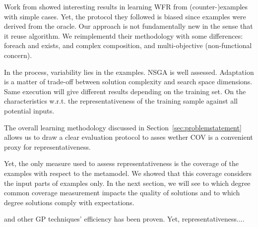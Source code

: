 Work from \cite{faunes2013} showed interesting results in learning WFR from (counter-)examples with simple cases. Yet, the protocol they followed is biased since examples were derived from the oracle.
Our approach is not fundamentally new in the sense that it reuse \cite{faunes2013-2} algorithm. We reimplementd their methodology with some differences: foreach and exists, and complex composition, and multi-objective (non-functional concern).


In the process, variability lies in the examples.
NSGA is well assessed. Adaptation is a matter of trade-off between solution complexity and search space dimensions.
Same execution will give different results depending on the training set. On the characteristics w.r.t. the representativeness of the training sample against all potential inputs.


The overall learning methodology discussed in Section~\ref{sec:problemstatement} allows us to draw a clear evaluation protocol to asses wether COV is a convenient proxy for representativeness. 


Yet, the only measure used to assess representativeness is the coverage of the examples with respect to the metamodel. We showed that this coverage considers the input parts of examples only. In the next section, we will see to which degree common coverage measurement impacts the quality of solutions and to which degree solutions comply with expectations.

\nsga and other GP techniques' efficiency has been proven. Yet, representativeness....
